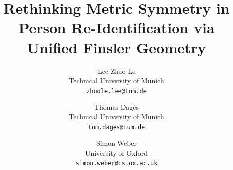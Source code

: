 \documentclass[10pt,twocolumn,letterpaper]{article}
\title{Rethinking Metric Symmetry in Person Re-Identification via Unified Finsler Geometry}
\author{Lee Zhuo Le \\
Technical University of Munich\\
{\tt\small zhuole.lee@tum.de}
\and
Thomas Dagès\\
Technical University of Munich\\
{\tt\small tom.dages@tum.de} \\
\and
Simon Weber\\
University of Oxford\\
{\tt\small simon.weber@cs.ox.ac.uk}
}
\begin{document}
\maketitle
    







{
    \small
    
    
}


\end{document}
